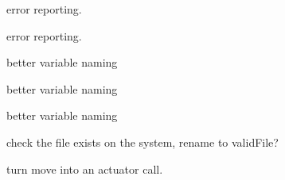 \begin{DoxyRefList}
\item[Member \mbox{\hyperlink{interface_8cpp_a0eca4d9adccf7ea7711afaaa4bfb2843}{set\+\_\+enabled}} (QObject $\ast$parent, const char $\ast$key, bool enabled)]\label{todo__todo000003}%
%
error reporting.  
\item[Member \mbox{\hyperlink{interface_8cpp_adc2edf17601102cd3f68307eb8fb93d9}{set\+\_\+visibility}} (QObject $\ast$parent, const char $\ast$key, bool visibility)]\label{todo__todo000004}%
%
error reporting.  
\item[Member \mbox{\hyperlink{structSubDescriptor___affb2c75b7f632338f368aafab49f678d}{Sub\+Descriptor\+\_\+\+::color\+Code}} ]\label{todo__todo000203}%
%
better variable naming  
\item[Member \mbox{\hyperlink{structSubDescriptor___a0cfe04519ff6dab092ee7c002e55e520}{Sub\+Descriptor\+\_\+\+::some\+Int}} ]\label{todo__todo000201}%
%
better variable naming  
\item[Member \mbox{\hyperlink{structSubDescriptor___a6154b0f4ec7815c6d26c71852506418e}{Sub\+Descriptor\+\_\+\+::some\+Other\+Int}} ]\label{todo__todo000202}%
%
better variable naming  
\item[Member \mbox{\hyperlink{mainwindow_8cpp_a8e199e892707e7dbbe2e5b44513253c8}{valid\+File\+Format}} (String file\+Name)]\label{todo__todo000009}%
%
check the file exists on the system, rename to valid\+File?  
\item[Member \mbox{\hyperlink{classView_ae820c6a86f0a1908bf451f86db043489}{View\+::mouse\+Move\+Event}} (QMouse\+Event $\ast$event)]\label{todo__todo000197}%
%
turn move into an actuator call. 
\end{DoxyRefList}
